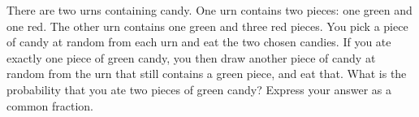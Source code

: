 There are two urns containing candy. One urn contains two pieces: one green and one red. The other urn contains one green and three red pieces. You pick a piece of candy at random from each urn and eat the two chosen candies. If you ate exactly one piece of green candy, you then draw another piece of candy at random from the urn that still contains a green piece, and eat that. What is the probability that you ate two pieces of green candy? Express your answer as a common fraction.
